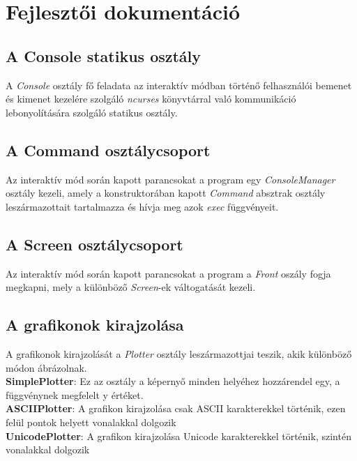 \section{Fejlesztői dokumentáció}

\subsection{A Console statikus osztály}
A \textit{Console} osztály fő feladata az interaktív módban történő felhasználói
bemenet és kimenet kezelére szolgáló \textit{ncurses} könyvtárral való kommunikáció
lebonyolítására szolgáló statikus osztály.

\begin{center}
\end{center}

\subsection{A Command osztálycsoport}
Az interaktív mód során kapott parancsokat a program egy \textit{ConsoleManager}
osztály kezeli, amely a konstruktorában kapott \textit{Command} absztrak osztály
leszármazottait tartalmazza és hívja meg azok \textit{exec} függvényeit.

\begin{center}
\end{center}

\subsection{A Screen osztálycsoport}
Az interaktív mód során kapott parancsokat a program a \textit{Front} oszály fogja
megkapni, mely a különböző \textit{Screen}-ek váltogatását kezeli.

\begin{center}
\end{center}

\subsection{A grafikonok kirajzolása}
A grafikonok kirajzolását a \textit{Plotter} osztály leszármazottjai teszik,
akik különböző módon ábrázolnak.\\
\textbf{SimplePlotter}: Ez az osztály a képernyő minden helyéhez hozzárendel egy, a függvénynek megfelelt
y értéket.\\
\textbf{ASCIIPlotter}: A grafikon kirajzolása csak ASCII karakterekkel történik,
ezen felül pontok helyett vonalakkal dolgozik\\
\textbf{UnicodePlotter}: A grafikon kirajzolása Unicode karakterekkel történik,
szintén vonalakkal dolgozik\\


